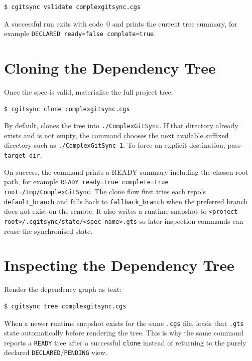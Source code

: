 \documentclass[11pt,a4paper]{article}
\begin{document}
\begin{lstlisting}[language=bash]
$ cgitsync validate complexgitsync.cgs
\end{lstlisting}

A successful run exits with code~0 and prints the current tree summary, for
example \texttt{DECLARED ready=false complete=true}.

\section{Cloning the Dependency Tree}

Once the spec is valid, materialise the full project tree:

\begin{lstlisting}[language=bash]
$ cgitsync clone complexgitsync.cgs
\end{lstlisting}

By default, \cgscli{} clones the tree into \texttt{./ComplexGitSync}. If that
directory already exists and is not empty, the command chooses the next
available suffixed directory such as \texttt{./ComplexGitSync-1}. To force an
explicit destination, pass \texttt{--target-dir}.

On success, the command prints a READY summary including the chosen root path,
for example \texttt{READY ready=true complete=true root=/tmp/ComplexGitSync}.
The clone flow first tries each repo's \texttt{default\_branch} and falls back
to \texttt{fallback\_branch} when the preferred branch does not exist on the
remote. It also writes a runtime snapshot to
\texttt{<project-root>/.cgitsync/state/<spec-name>.gts} so later inspection
commands can reuse the synchronised state.

\section{Inspecting the Dependency Tree}

Render the dependency graph as text:

\begin{lstlisting}[language=bash]
$ cgitsync tree complexgitsync.cgs
\end{lstlisting}

When a newer runtime snapshot exists for the same \texttt{.cgs} file,
\cgscli{} loads that \texttt{.gts} state automatically before rendering the
tree. This is why the same command reports a \texttt{READY} tree after a
successful \texttt{clone} instead of returning to the purely declared
\texttt{DECLARED}/\texttt{PENDING} view.
\end{document}
